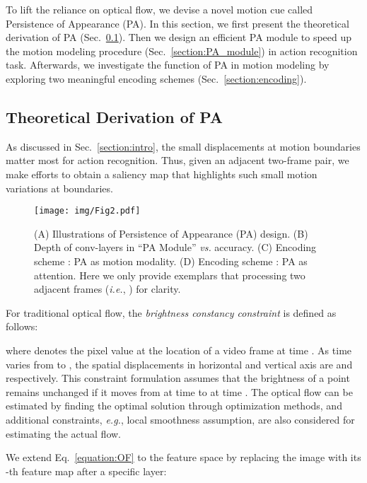 \documentclass[journal]{IEEEtran}
\begin{document}
To lift the reliance on optical flow, we devise a novel motion cue called Persistence of Appearance (PA). In this section, we first present the theoretical derivation of PA (Sec.~\ref{section:sub_PA}). Then we design an efficient PA module to speed up the motion modeling procedure (Sec.~\ref{section:PA_module}) in action recognition task. Afterwards, we investigate the function of PA in motion modeling by exploring two meaningful encoding schemes (Sec.~\ref{section:encoding}).

\subsection{Theoretical Derivation of PA} \label{section:sub_PA}

As discussed in Sec.~\ref{section:intro}, the small displacements at motion boundaries matter most for action recognition. Thus, given an adjacent two-frame pair, we make efforts to obtain a saliency map that highlights such small motion variations at boundaries. 



\begin{figure*}
\begin{center}
\texttt{[image: img/Fig2.pdf]}
\end{center}
   \caption{(A) Illustrations of Persistence of Appearance (PA) design. (B) Depth of conv-layers in ``PA Module'' \emph{vs.} accuracy. (C) Encoding scheme : PA as motion modality. (D) Encoding scheme : PA as attention. Here we only provide exemplars that processing two adjacent frames (\emph{i.e.}, ) for clarity.}
\label{fig:PA}
\end{figure*}

For traditional optical flow, the \emph{brightness constancy constraint} is defined as follows:

where  denotes the pixel value at the location  of a video frame at time . As time varies from  to , the spatial displacements in horizontal and vertical axis are  and  respectively. This constraint formulation assumes that the brightness of a point remains unchanged if it moves from  at time  to  at time . The optical flow can be estimated by finding the optimal solution  through optimization methods, and additional constraints, \emph{e.g.}, local smoothness assumption, are also considered for estimating the actual flow.

We extend Eq.~\ref{equation:OF} to the feature space by replacing the image  with its -th feature map  after a specific layer:
\end{document}
